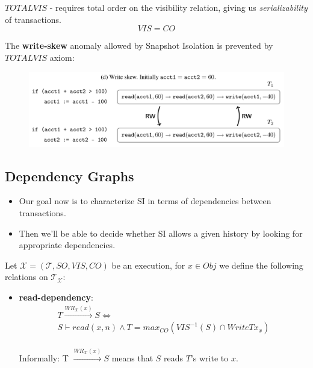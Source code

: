 \documentclass{beamer}
\begin{document}
\begin{frame}
	$TOTALVIS$ - requires total order on the visibility relation, giving us \emph{serializability} of transactions.
	$$ VIS = CO $$
\end{frame}

\begin{frame}
	The \textbf{write-skew} anomaly allowed by Snapshot Isolation is prevented by $TOTALVIS$ axiom:
	\begin{figure}
		\includegraphics[scale=0.25]{fig2d}
	\end{figure}
\end{frame}

\subsection{Dependency Graphs}

\begin{frame}
	\begin{itemize}
		\item Our goal now is to characterize SI in terms of dependencies between transactions.
		\item Then we'll be able to decide whether SI allows a given history by looking for appropriate dependencies.
	\end{itemize}
\end{frame}

\begin{frame}
	Let $\mathcal{X} = (\mathcal{T}, SO, VIS, CO)$ be an execution, for $x \in Obj$ we define the following relations on $\mathcal{T}_\mathcal{X}$:
	\begin{itemize}
		\item \textbf{read-dependency}:
		\begin{multline*}
			T \xrightarrow{WR_\mathcal{X}(x)} S \Leftrightarrow \\
			S \vdash read(x,n) \wedge T = max_{CO}\left( VIS^{-1}(S) \cap WriteTx_x \right)
		\end{multline*} \\
		Informally: T $ \xrightarrow{WR_\mathcal{X}(x)} S $ means that $S$ reads $T$'s write to $x$.
	\end{itemize}
\end{frame}
\end{document}
